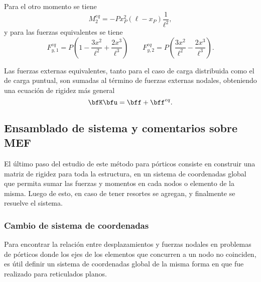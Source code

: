 Para el otro momento se tiene
\begin{equation}\label{eqn:M2eqP}
	M_2^{eq} = -P x_P^2 (\ell-x_P) \frac{1}{\ell^2},
\end{equation}
%
y para las fuerzas equivalentes se tiene
%
\begin{equation}\label{eqn:FyeqP}
	F_{y,1}^{eq} = P \left(1 - \frac{3 x^{2}}{\ell^{2}} + \frac{2 x^{3}}{\ell^{3}}\right) \qquad
	F_{y,2}^{eq} =
	P \left(\frac{3 x^{2}}{\ell^{2}} - \frac{2 x^{3}}{\ell^{3}}\right).
\end{equation}




Las fuerzas externas equivalentes, tanto para el caso de carga distribuida como el de carga puntual, son sumadas al término de fuerzas externas nodales, obteniendo una ecuación de rigidez más general
%
\begin{equation}
	\bfK \bfu = \bff + \bff^{eq}.
\end{equation}




\subsection{Ensamblado de sistema y comentarios sobre MEF}

El último paso del estudio de este método para pórticos consiste en construir una matriz de rigidez para toda la estructura, en un sistema de coordenadas global que permita sumar las fuerzas y momentos en cada nodos o elemento de la misma.
%
Luego de esto, en caso de tener resortes se agregan, y finalmente se resuelve el sistema.

\subsubsection{Cambio de sistema de coordenadas}

Para encontrar la relación entre desplazamientos y fuerzas nodales en problemas de pórticos donde los ejes de los elementos que concurren a un nodo no coinciden, es útil definir un sistema de coordenadas global de la misma forma en que fue realizado para reticulados planos.
%

